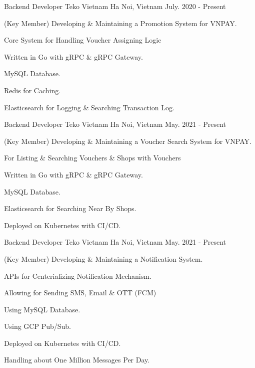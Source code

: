\begin{cventries}

\cventry
{Backend Developer} %
{Teko Vietnam} %
{Ha Noi, Vietnam} %
{July. 2020 - Present} %
{ %
\begin{cvitems}
\item{(Key Member) Developing \& Maintaining a Promotion System for VNPAY.}
\item{Core System for Handling Voucher Assigning Logic}
\item{Written in Go with gRPC \& gRPC Gateway.}
\item{MySQL Database.}
\item{Redis for Caching.}
\item{Elasticsearch for Logging \& Searching Transaction Log.}
\end{cvitems}
}


\cventry
{Backend Developer} %
{Teko Vietnam} %
{Ha Noi, Vietnam} %
{May. 2021 - Present} %
{ %
\begin{cvitems}
\item{(Key Member) Developing \& Maintaining a Voucher Search System for VNPAY.}
\item{For Listing \& Searching Vouchers \& Shops with Vouchers}
\item{Written in Go with gRPC \& gRPC Gateway.}
\item{MySQL Database.}
\item{Elasticsearch for Searching Near By Shops.}
\item{Deployed on Kubernetes with CI/CD.}
\end{cvitems}
}


\cventry
{Backend Developer} %
{Teko Vietnam} %
{Ha Noi, Vietnam} %
{May. 2021 - Present} %
{ %
\begin{cvitems}
\item{(Key Member) Developing \& Maintaining a Notification System.}
\item{APIs for Centerializing Notification Mechanism.}
\item{Allowing for Sending SMS, Email \& OTT (FCM)}
\item{Using MySQL Database.}
\item{Using GCP Pub/Sub.}
\item{Deployed on Kubernetes with CI/CD.}
\item{Handling about One Million Messages Per Day.}
\end{cvitems}
}


\end{cventries}
